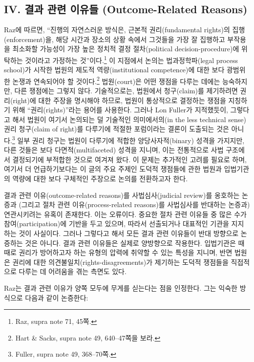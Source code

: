 \documentclass[a4paper,12pt,oneside]{article}  %
\begin{document}
\subsection{IV. 결과 관련 이유들 (Outcome-Related
Reasons)}\label{iv.-uxacb0uxacfc-uxad00uxb828-uxc774uxc720uxb4e4-outcome-related-reasons}

Raz에 따르면, ``진행의 자연스러운 방식은, 근본적 권리(fundamental
rights)의 집행(enforcement)을, 해당 시간과 장소의 상황 속에서 그것들을
가장 잘 집행하고 부작용을 최소화할 가능성이 가장 높은 정치적 결정
절차(political decision-procedure)에 위탁하는 것이라고 가정하는
것''이다.\footnote{Raz, supra note 71, 45쪽.} 이 지점에서 논의는
법과정학파(legal process school)가 시작한 법원의 제도적
역량(institutional competence)에 대한 보다 광범위한 논쟁과 연속되어야 할
것이다.\footnote{Hart \& Sacks, supra note 49, 640--47쪽을 보라.}
법원(court)은 어떤 쟁점을 다루는 데에는 능숙하지만, 다른 쟁점에는 그렇지
않다. 기술적으로는, 법원에서 청구(claim)를 제기하려면 권리(right)에 대한
주장을 명시해야 하므로, 법원이 통상적으로 결정하는 쟁점을 지칭하기 위해
``권리(rights)''라는 용어를 사용한다. 그러나 Lon Fuller가 지적했듯이,
그렇다고 해서 법원이 여기서 논의되는 덜 기술적인 의미에서의(in the less
technical sense) 권리 청구(claim of right)를 다루기에 적절한 포럼이라는
결론이 도출되는 것은 아니다.\footnote{Fuller, supra note 49, 368--70쪽.}
일부 권리 청구는 법원이 다루기에 적합한 양당사자적(binary) 성격을
가지지만, 다른 것들은 보다 다면적(multifaceted) 성격을 지니며, 이는
전통적으로 사법 구조에서 결정되기에 부적합한 것으로 여겨져 왔다. 이
문제는 추가적인 고려를 필요로 하며, 여기서 더 언급하기보다는 이 글의
주요 주제인 도덕적 쟁점들에 관한 법원과 입법기관의 역량에 대한 보다
구체적인 주장으로 논의를 전환하고자 한다.

결과 관련 이유(outcome-related reasons)를 사법심사(judicial review)를
옹호하는 논증과 (그리고 절차 관련 이유(process-related reasons)를
사법심사를 반대하는 논증과) 연관시키려는 유혹이 존재한다. 이는 오류이다.
중요한 절차 관련 이유들 중 많은 수가 참여(participation)에 기반을 두고
있으며, 따라서 선출되거나 대표적인 기관을 지지하는 것이 사실이다. 그러나
그렇다고 해서 모든 결과 관련 이유들이 반대 방향으로 논증하는 것은
아니다. 결과 관련 이유들은 실제로 양방향으로 작용한다. 입법기관은 때때로
권리가 방어하고자 하는 유형의 압력에 취약할 수 있는 특성을 지니며, 반면
법원은 권리에 대한 의견불일치(rights-disagreements)가 제기하는 도덕적
쟁점들을 직접적으로 다루는 데 어려움을 겪는 측면도 있다.

Raz는 결과 관련 이유가 양쪽 모두에 무게를 싣는다는 점을 인정한다. 그는
익숙한 방식으로 다음과 같이 논증한다:
\end{document}
